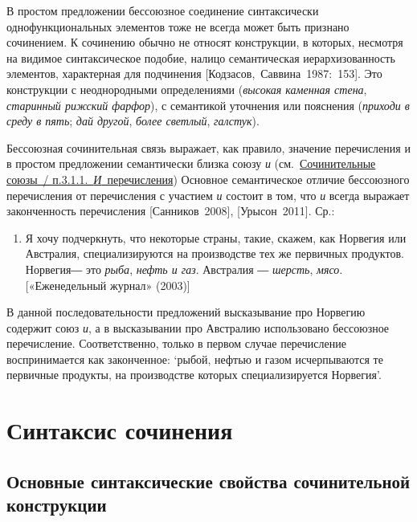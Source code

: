 В простом предложении бессоюзное соединение синтаксически
однофункциональных элементов тоже не всегда может быть признано
сочинением. К сочинению обычно не относят конструкции, в которых,
несмотря на видимое синтаксическое подобие, налицо семантическая
иерархизованность элементов, характерная для подчинения
{[}Кодзасов,~Саввина~1987:~153{]}. Это конструкции с неоднородными
определениями (\textit{высокая каменная стена}, \textit{старинный рижский
фарфор}), с семантикой уточнения или пояснения (\textit{приходи в среду в
пять}; \textit{дай другой}, \textit{более светлый}, \textit{галстук}).

Бессоюзная сочинительная связь выражает, как правило, значение
перечисления и в простом предложении семантически близка союзу \textit{и}
(см.~\underline{Сочинительные союзы~/ п.3.1.1.~\textit{И}~перечисления})
Основное семантическое отличие бессоюзного перечисления от перечисления
с участием \textit{и} состоит в том, что \textit{и} всегда выражает
законченность перечисления {[}Санников~2008{]}, {[}Урысон~2011{]}. Ср.:

\begin{enumerate}
\def\labelenumi{(\arabic{enumi})}
\setcounter{enumi}{65}
\item
  Я хочу подчеркнуть, что некоторые страны, такие, скажем, как Норвегия
  или Австралия, специализируются на производстве тех же первичных
  продуктов. Норвегия― это \textit{рыба}, \textit{нефть и газ}. Австралия ―
  \textit{шерсть}, \textit{мясо}. {[}«Еженедельный журнал» (2003){]}
\end{enumerate}

В данной последовательности предложений высказывание про Норвегию
содержит союз \textit{и}, а в высказывании про Австралию использовано
бессоюзное перечисление. Соответственно, только в первом случае
перечисление воспринимается как законченное: `рыбой, нефтью и газом
исчерпываются те первичные продукты, на производстве которых
специализируется Норвегия'.

\section{Синтаксис
сочинения}\label{ux441ux438ux43dux442ux430ux43aux441ux438ux441-ux441ux43eux447ux438ux43dux435ux43dux438ux44f}

\subsection{Основные синтаксические свойства сочинительной
конструкции}\label{ux43eux441ux43dux43eux432ux43dux44bux435-ux441ux438ux43dux442ux430ux43aux441ux438ux447ux435ux441ux43aux438ux435-ux441ux432ux43eux439ux441ux442ux432ux430-ux441ux43eux447ux438ux43dux438ux442ux435ux43bux44cux43dux43eux439-ux43aux43eux43dux441ux442ux440ux443ux43aux446ux438ux438}

